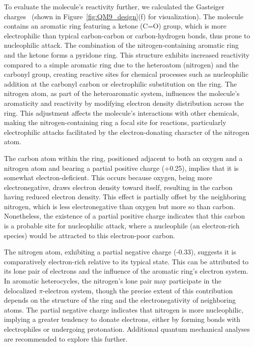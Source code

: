 To evaluate the molecule’s reactivity further, we calculated the Gasteiger charges~\cite{Gasteiger1980IterativeCharges} (shown in Figure~\ref{fig:QM9_design}(f) for visualization). The molecule contains an aromatic ring featuring a ketone (C=O) group, which is more electrophilic than typical carbon-carbon or carbon-hydrogen bonds, thus prone to nucleophilic attack. The combination of the nitrogen-containing aromatic ring and the ketone forms a pyridone ring. This structure exhibits increased reactivity compared to a simple aromatic ring due to the heteroatom (nitrogen) and the carbonyl group, creating reactive sites for chemical processes such as nucleophilic addition at the carbonyl carbon or electrophilic substitution on the ring. The nitrogen atom, as part of the heteroaromatic system, influences the molecule’s aromaticity and reactivity by modifying electron density distribution across the ring. This adjustment affects the molecule’s interactions with other chemicals, making the nitrogen-containing ring a focal site for reactions, particularly electrophilic attacks facilitated by the electron-donating character of the nitrogen atom.

The carbon atom within the ring, positioned adjacent to both an oxygen and a nitrogen atom and bearing a partial positive charge (+0.25), implies that it is somewhat electron-deficient. This occurs because oxygen, being more electronegative, draws electron density toward itself, resulting in the carbon having reduced electron density. This effect is partially offset by the neighboring nitrogen, which is less electronegative than oxygen but more so than carbon. Nonetheless, the existence of a partial positive charge indicates that this carbon is a probable site for nucleophilic attack, where a nucleophile (an electron-rich species) would be attracted to this electron-poor carbon.

The nitrogen atom, exhibiting a partial negative charge (-0.33), suggests it is comparatively electron-rich relative to its typical state. This can be attributed to its lone pair of electrons and the influence of the aromatic ring's electron system. In aromatic heterocycles, the nitrogen's lone pair may participate in the delocalized $\pi$-electron system, though the precise extent of this contribution depends on the structure of the ring and the electronegativity of neighboring atoms. The partial negative charge indicates that nitrogen is more nucleophilic, implying a greater tendency to donate electrons, either by forming bonds with electrophiles or undergoing protonation. Additional quantum mechanical analyses are recommended to explore this further.

